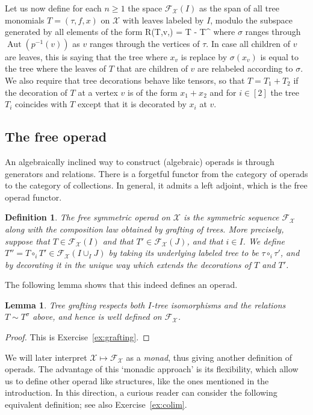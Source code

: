 \documentclass[fleqn, a4paper, twoside]{article}
\makeatletter
\newcommand{\0}{\langle 0\rangle}
\newcommand{\XX}{\mathcal{X}}
\newcommand{\FF}{\mathcal{F}}
\let\[\@undefined
\DeclareRobustCommand{\[}{\begin{equation}}%
\let\]\@undefined
\DeclareRobustCommand{\]}{\end{equation}}%
\theoremstyle{mytheorem}
\newtheorem{lemma}[theorem]{Lemma}
\theoremstyle{introthm}
\theoremstyle{mydefinition}
\newtheorem{definition}[theorem]{Definition}
\theoremstyle{mydefinition2}
\theoremstyle{plain} %
\newcommand{\?}{\,?\,}
\newcommand{\Aut}{\operatorname{Aut}}
\theoremstyle{mytheorem}
\theoremstyle{plain} %
\makeatother
\begin{document}
Let us now define for each $n\geqslant 1$ the
space $\FF_\XX(I)$ as the span of all tree monomials
$T = (\tau,f,x)$ on $\XX$ with leaves labeled by $I$,
modulo the subspace generated by all elements of the form
\[ R(T,v,\sigma) = T - T^\sigma \]
where $\sigma$ ranges through $\Aut(p^{-1}(v))$ as
$v$ ranges through the vertices of $\tau$. In case
all children of $v$ are leaves, this is saying that
the tree where $x_v$ is replace by $\sigma(x_v)$
is equal to the tree where the leaves of $T$ that are
children of $v$ are relabeled according to $\sigma$.
We also require that tree decorations behave like
tensors, so that $T = T_1+T_2$ if the decoration
of $T$ at a vertex $v$ is of the form $x_1 + x_2$
and for $i\in [2]$ the tree $T_i$ coincides with
$T$ except that it is decorated by $x_i$ at $v$.



\subsection{The free operad}
An algebraically inclined way to construct
(algebraic) operads is through generators and
relations. There is a forgetful functor
from the category of operads to the category
of collections. In general, it admits a left
adjoint, which is the free operad functor.

\begin{definition}
The \emph{free symmetric operad} on $\XX$ is the
symmetric sequence $\FF_\XX$ along with the composition
law obtained by grafting of trees. More precisely,
suppose that $T\in \FF_\XX(I)$ and that $T'\in\FF_\XX(J)$,
and that $i\in I$. We define $T'' =T\circ_i T' \in 
\FF_\XX(I\cup_I J)$ by taking its underlying labeled
tree to be $\tau\circ_i \tau'$, and by decorating it
in the unique way which extends the decorations of 
$T$ and $T'$.
\end{definition}

The following lemma shows that this indeed defines an operad.

\begin{lemma}
Tree grafting respects both $I$-tree 
isomorphisms and the relations $T\sim T^\sigma$
above, and hence is well defined on $\FF_\XX$.
\end{lemma}

\begin{proof}
This is Exercise~\ref{ex:grafting}.
\end{proof}

 We will later
interpret $\XX\longmapsto \FF_\XX$ as a \emph{monad},
thus giving another definition of operads. The
advantage of this `monadic approach' is its 
flexibility, which allow us to define other
operad like structures, like the ones 
mentioned in the introduction.
In this direction, a curious reader 
can consider the following 
equivalent definition; see also Exercise~\ref{ex:colim}.
\end{document}
